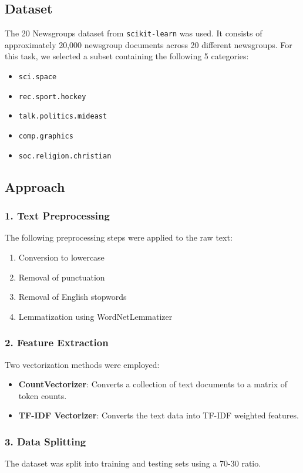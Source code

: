 \documentclass[a4paper,12pt]{article}
\begin{document}
\subsection{Dataset}
The 20 Newsgroups dataset from \texttt{scikit-learn} was used. It consists of approximately 20,000 newsgroup documents across 20 different newsgroups. For this task, we selected a subset containing the following 5 categories:
\begin{itemize}
    \item \texttt{sci.space}
    \item \texttt{rec.sport.hockey}
    \item \texttt{talk.politics.mideast}
    \item \texttt{comp.graphics}
    \item \texttt{soc.religion.christian}
\end{itemize}

\subsection{Approach}

\subsubsection*{1. Text Preprocessing}
The following preprocessing steps were applied to the raw text:
\begin{enumerate}
    \item Conversion to lowercase
    \item Removal of punctuation
    \item Removal of English stopwords
    \item Lemmatization using WordNetLemmatizer
\end{enumerate}

\subsubsection*{2. Feature Extraction}
Two vectorization methods were employed:
\begin{itemize}
    \item \textbf{CountVectorizer}: Converts a collection of text documents to a matrix of token counts.
    \item \textbf{TF-IDF Vectorizer}: Converts the text data into TF-IDF weighted features.
\end{itemize}

\subsubsection*{3. Data Splitting}
The dataset was split into training and testing sets using a 70-30 ratio.
\end{document}

